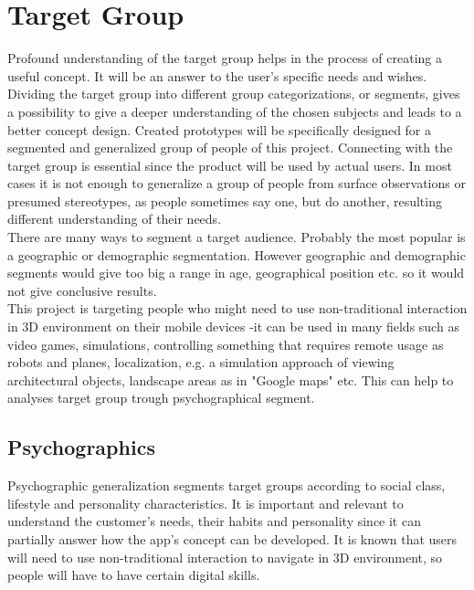 \section{Target Group}
\label{TargetGroup}
Profound understanding of the target group helps in the process of creating a useful concept. It will be an answer to the user's specific needs and wishes. Dividing the target group into different group categorizations, or segments, gives a possibility to give a deeper understanding of the chosen subjects and leads to a better concept design. Created prototypes will be specifically designed for a segmented and generalized group of people of this project. Connecting with the target group is essential since the product will be used by actual users. In most cases it is not enough to generalize a group of people from surface observations or presumed stereotypes, as people sometimes say one, but do another, resulting different understanding of their needs.
\\
There are many ways to segment a target audience. Probably the most popular is a geographic or demographic segmentation. However geographic and demographic segments would give too big a range in age, geographical position etc. so it would not give conclusive results.
\\
This project is targeting people who might need to use non-traditional interaction in 3D environment on their mobile devices -it can be used in many fields such as video games, simulations, controlling something that requires remote usage as robots and planes, localization, e.g. a simulation approach of viewing architectural objects, landscape areas as in "Google maps" etc. This can help to analyses target group trough psychographical segment. 
\\
\subsection{Psychographics}
Psychographic generalization segments target groups according to social class, lifestyle and personality characteristics. \cite{Psychographic} It is important and relevant to understand the customer's needs, their habits and personality since it can partially answer how the app's concept can be developed. It is known that users will need to use non-traditional interaction to navigate in 3D environment, so people will have to have certain digital skills. 
\\
